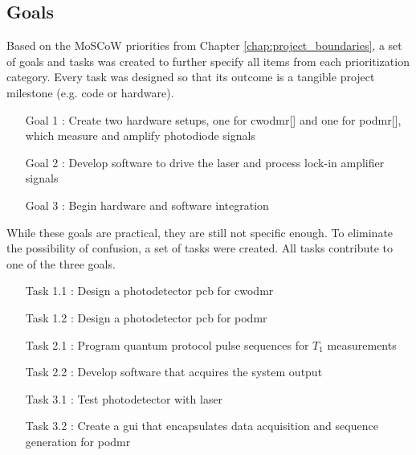 \subsection{Goals} \label{chap:goals}
Based on the MoSCoW priorities from Chapter \ref{chap:project_boundaries}, a set of goals and tasks was created to further specify all items from each prioritization category. Every task was designed so that its outcome is a tangible project milestone (e.g. code or hardware).

\begin{itemize}
	\item[Goal 1]: Create two hardware setups, one for \gls{cwodmr}[] and one for \gls{podmr}[], which measure and amplify photodiode signals 
	\item[Goal 2]: Develop software to drive the laser and process lock-in amplifier signals
	\item[Goal 3]: Begin hardware and software integration
\end{itemize}

While these goals are practical, they are still not specific enough. To eliminate the possibility of confusion, a set of tasks were created. All tasks contribute to one of the three goals.

\begin{itemize}
	\item[Task 1.1]: Design a photodetector \gls{pcb} for \gls{cwodmr}
	\item[Task 1.2]: Design a photodetector \gls{pcb} for \gls{podmr}
	\item[Task 2.1]: Program quantum protocol pulse sequences for $T_1$ measurements 
	\item[Task 2.2]: Develop software that acquires the system output
	\item[Task 3.1]: Test photodetector with laser
	\item[Task 3.2]: Create a \gls{gui} that encapsulates data acquisition and sequence generation for \gls{podmr}
\end{itemize}

